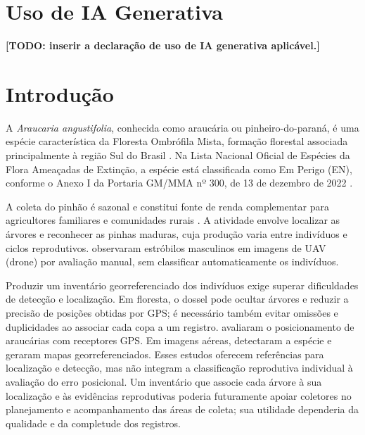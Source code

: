 \section*{Uso de IA Generativa}

\textbf{[TODO: inserir a declaração de uso de IA generativa aplicável.]}

\section{Introdução}

A \textit{Araucaria angustifolia}, conhecida como araucária ou pinheiro-do-paraná, é uma espécie característica da Floresta Ombrófila Mista, formação florestal associada principalmente à região Sul do Brasil \cite{saad2021}. Na Lista Nacional Oficial de Espécies da Flora Ameaçadas de Extinção, a espécie está classificada como Em Perigo (EN), conforme o Anexo I da Portaria GM/MMA nº 300, de 13 de dezembro de 2022 \cite{mma2022}.

A coleta do pinhão é sazonal e constitui fonte de renda complementar para agricultores familiares e comunidades rurais \citep{ipa2024}. A atividade envolve localizar as árvores e reconhecer as pinhas maduras, cuja produção varia entre indivíduos e ciclos reprodutivos. \citet{demetrio2022} observaram estróbilos masculinos em imagens de UAV (drone) por avaliação manual, sem classificar automaticamente os indivíduos.

Produzir um inventário georreferenciado dos indivíduos exige superar dificuldades de detecção e localização. Em floresta, o dossel pode ocultar árvores e reduzir a precisão de posições obtidas por GPS; é necessário também evitar omissões e duplicidades ao associar cada copa a um registro. \citet{venancio2010} avaliaram o posicionamento de araucárias com receptores GPS. Em imagens aéreas, \citet{karasinski2025} detectaram a espécie e geraram mapas georreferenciados. Esses estudos oferecem referências para localização e detecção, mas não integram a classificação reprodutiva individual à avaliação do erro posicional. Um inventário que associe cada árvore à sua localização e às evidências reprodutivas poderia futuramente apoiar coletores no planejamento e acompanhamento das áreas de coleta; sua utilidade dependeria da qualidade e da completude dos registros.

